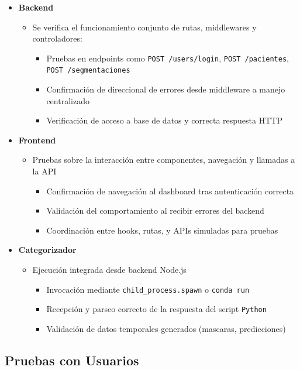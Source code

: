 \begin{itemize}
    \item \textbf{Backend}
    \begin{itemize}
        \item Se verifica el funcionamiento conjunto de rutas, middlewares y controladores:
        \begin{itemize}
            \item Pruebas en endpoints como \texttt{POST /users/login}, \texttt{POST /pacientes}, \texttt{POST /segmentaciones}
            \item Confirmación de direccional de errores desde middleware a manejo centralizado
            \item Verificación de acceso a base de datos y correcta respuesta HTTP
        \end{itemize}
    \end{itemize}
\item \textbf{Frontend}
\begin{itemize}
    \item Pruebas sobre la interacción entre componentes, navegación y llamadas a la API
    \begin{itemize}
        \item Confirmación de navegación al dashboard tras autenticación correcta
        \item Validación del comportamiento al recibir errores del backend
        \item Coordinación entre hooks, rutas, y APIs simuladas para pruebas
    \end{itemize}
\end{itemize}
\item \textbf{Categorizador}
\begin{itemize}
    \item Ejecución integrada desde backend Node.js
    \begin{itemize}
        \item Invocación mediante \texttt{child\_process.spawn} o \texttt{conda run}
        \item Recepción y parseo correcto de la respuesta del script \texttt{Python}
        \item Validación de datos temporales generados (mascaras, predicciones)
    \end{itemize}
\end{itemize}
\end{itemize}



\subsection{Pruebas con Usuarios}
\label{ssc:PU}


